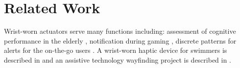 \documentclass{chi-ext}
\begin{document}





\section{Related Work}
Wrist-worn actuators serve many functions including: assessment of cognitive performance in the elderly \cite{ivorra2008minimally}, notification during gaming \cite{martins2008gauntlet}, discrete patterns for alerts for the on-the-go users \cite{lee2010buzzwear,chen2008tactor}. A wrist-worn haptic device for swimmers is described in \cite{forster2009non} and an assistive technology wayfinding project is described in \cite{Jesus-Oliveira:2013aa}.
\end{document}
